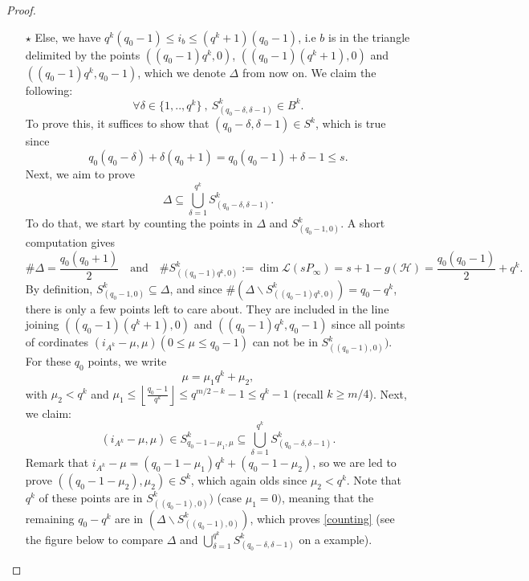 \documentclass[a4paper]{article}
\newcommand{\calH}{\mathcal{H}}
\newcommand{\calL}{\mathcal{L}}
\begin{document}
\begin{proof}
\begin{itemize}
 \item[$\star$] Else, we have $q^k(q_0-1) \leq i_b \leq (q^k+1)(q_0-1)$, i.e $b$ is in the triangle delimited by the points $((q_0-1)q^k,0)$, $((q_0-1)(q^k+1),0)$ and $((q_0-1)q^k,q_0-1)$, which we denote $\Delta$ from now on. We claim the following:
 \[ \forall \delta \in \{1,..,q^k\} \ , \ S^k_{(q_0-\delta,\delta-1)} \in B^k.\]
 To prove this, it suffices to show that $(q_0-\delta,\delta-1) \in S^k$, which is true since
 \[q_0(q_0-\delta) + \delta(q_0+1) = q_0(q_0-1)+\delta-1 \leq s.\]
 Next, we aim to prove
 \begin{equation} \label{counting}
 \Delta \subseteq \bigcup_{\delta=1}^{q^k} S^k_{(q_0-\delta,\delta-1)}.
 \end{equation}
 To do that, we start by counting the points in $\Delta$ and $S^k_{(q_0-1,0)}$. A short computation gives
 \[ \# \Delta = \dfrac{q_0(q_0+1)}{2} \quad \mathrm{and} \quad \# S^k_{((q_0-1)q^k,0)} := \dim \calL(sP_{\infty}) = s+1-g(\calH) = \dfrac{q_0(q_0-1)}{2} + q^k.\]
By definition, $S^k_{(q_0-1,0)} \subseteq \Delta$, and since $\# (\Delta \backslash  S^k_{((q_0-1)q^k,0)}) = q_0-q^k$, there is only a few points left to care about.
 They are included in the line joining $((q_0-1)(q^k+1),0)$ and $((q_0-1)q^k,q_0-1)$ since all points of cordinates $(i_{A^k}-\mu,\mu) (0 \leq \mu \leq q_0-1)$ can not be in $S^k_{((q_0-1),0)})$. For these $q_0$ points, we write 
 \[ \mu = \mu_1q^k + \mu_2,\]
 with $\mu_2 < q^k$ and $\mu_1 \leq \left\lfloor\frac{q_0-1}{q^k}\right\rfloor \leq q^{m/2-k}-1 \leq q^k-1$ (recall $k \geq m/4$). Next, we claim:
 \[(i_{A^k}-\mu,\mu) \in S^k_{q_0-1-\mu_1,\mu} \subseteq \bigcup_{\delta=1}^{q^k} S^k_{(q_0-\delta,\delta-1)}.\]
 Remark that $i_{A^k}-\mu = (q_0-1-\mu_1)q^k+(q_0-1-\mu_2)$, so we are led to prove $((q_0-1-\mu_2),\mu_2) \in S^k$, which again olds since $\mu_2 < q^k$. Note that $q^k$ of these points are in $S^k_{((q_0-1),0)})$ (case $\mu_1=0)$, meaning that the remaining $q_0-q^k$ are in $(\Delta \backslash  S^k_{((q_0-1),0)})$, which proves \eqref{counting} (see the figure below to compare $\Delta$ and $\bigcup_{\delta=1}^{q^k} S^k_{(q_0-\delta,\delta-1)}$ on a example).
 
 \begin{figure}[h]
\begin{center}
\end{center}
\end{figure}
\end{itemize}
\end{proof}
\end{document}

